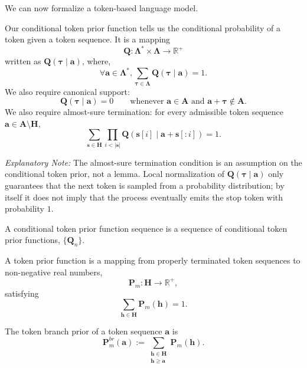 We can now formalize a token-based language model.

\begin{definition}
\label{def:conditional-token-prior-function}
    Our conditional token prior function tells us the conditional probability of a token
    given a token sequence. It is a mapping
    $$
    \mathbf{Q} : \mathbf{\Lambda}^* \times \mathbf{\Lambda} \to \mathbb{R}^+
    $$
    written as $\mathbf{Q}(\boldsymbol{\tau} \mid \mathbf{a})$,
    where,
    $$
    \forall \mathbf{a} \in \mathbf{\Lambda}^*, \sum_{\boldsymbol{\tau} \in \mathbf{\Lambda}} \mathbf{Q}(\boldsymbol{\tau} \mid \mathbf{a}) = 1.
    $$
    We also require canonical support:
    \[
    \mathbf{Q}(\boldsymbol{\tau} \mid \mathbf{a}) = 0
    \qquad
    \text{whenever } \mathbf{a} \in \mathbf{A} \text{ and } \mathbf{a}+\boldsymbol{\tau} \notin \mathbf{A}.
    \]
    We also require almost-sure termination: for every admissible token sequence
    $\mathbf{a} \in \mathbf{A}\setminus\mathbf{H}$,
    \[
    \sum_{\mathbf{s} \in \mathbf{H}}
    \prod_{i < |\mathbf{s}|} \mathbf{Q}(\mathbf{s}[i] \mid \mathbf{a}+\mathbf{s}[:i])
    = 1.
    \]
\end{definition}

\textit{Explanatory Note: } The almost-sure termination condition is an assumption on the
conditional token prior, not a lemma. Local normalization of $\mathbf{Q}(\boldsymbol{\tau}\mid\mathbf{a})$
only guarantees that the next token is sampled from a probability distribution; by itself it does
not imply that the process eventually emits the stop token with probability $1$.

\begin{definition}
    A conditional token prior function sequence is a sequence of conditional token prior functions,
    $ \{ \mathbf{Q}_n \} $.
\end{definition}

\begin{definition}
    A token prior function is a mapping from properly terminated token sequences to
    non-negative real numbers,
    \[
    \mathbf{P}_m : \mathbf{H} \to \mathbb{R}^+,
    \]
    satisfying
    \[
    \sum_{\mathbf{h} \in \mathbf{H}} \mathbf{P}_m(\mathbf{h}) = 1.
    \]
\end{definition}

\begin{definition}
\label{def:token-branch-prior-function}
    The token branch prior of a token sequence $\mathbf{a}$ is
    \[
    \mathbf{P}^{br}_m(\mathbf{a})
    :=
    \sum_{\substack{\mathbf{h} \in \mathbf{H} \\ \mathbf{h} \geq \mathbf{a}}}
    \mathbf{P}_m(\mathbf{h}).
    \]
\end{definition}

